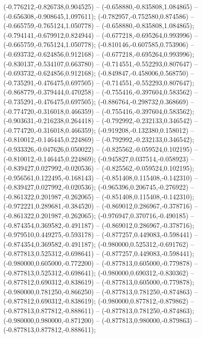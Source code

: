  (-0.776212,-0.826738,0.904525) -- (-0.658880,-0.835808,1.084865) -- (-0.656308,-0.908645,1.097611);
 (-0.782957,-0.752580,0.874586) -- (-0.665759,-0.765124,1.050778) -- (-0.658880,-0.835808,1.084865);
 (-0.794141,-0.679912,0.824944) -- (-0.677218,-0.695264,0.993996) -- (-0.665759,-0.765124,1.050778);
 (-0.810146,-0.607585,0.753906) -- (-0.693732,-0.624856,0.912168) -- (-0.677218,-0.695264,0.993996);
 (-0.830137,-0.534107,0.663780) -- (-0.714551,-0.552293,0.807647) -- (-0.693732,-0.624856,0.912168);
 (-0.849847,-0.458006,0.568750) -- (-0.735291,-0.476475,0.697505) -- (-0.714551,-0.552293,0.807647);
 (-0.868779,-0.379444,0.470258) -- (-0.755416,-0.397604,0.583562) -- (-0.735291,-0.476475,0.697505);
 (-0.886764,-0.298732,0.368669) -- (-0.774720,-0.316018,0.466359) -- (-0.755416,-0.397604,0.583562);
 (-0.903631,-0.216238,0.264418) -- (-0.792992,-0.232133,0.346542) -- (-0.774720,-0.316018,0.466359);
 (-0.919208,-0.132380,0.158012) -- (-0.810012,-0.146445,0.224869) -- (-0.792992,-0.232133,0.346542);
 (-0.933326,-0.047626,0.050022) -- (-0.825562,-0.059524,0.102195) -- (-0.810012,-0.146445,0.224869);
 (-0.945827,0.037514,-0.058923) -- (-0.839427,0.027992,-0.020536) -- (-0.825562,-0.059524,0.102195);
 (-0.956561,0.122495,-0.168143) -- (-0.851408,0.115408,-0.142310) -- (-0.839427,0.027992,-0.020536);
 (-0.965396,0.206745,-0.276922) -- (-0.861322,0.201987,-0.262065) -- (-0.851408,0.115408,-0.142310);
 (-0.972221,0.289681,-0.384520) -- (-0.869012,0.286967,-0.378716) -- (-0.861322,0.201987,-0.262065);
 (-0.976947,0.370716,-0.490185) -- (-0.874354,0.369582,-0.491187) -- (-0.869012,0.286967,-0.378716);
 (-0.979510,0.449275,-0.593178) -- (-0.877257,0.449083,-0.598441) -- (-0.874354,0.369582,-0.491187);
 (-0.980000,0.525312,-0.691762) -- (-0.877813,0.525312,-0.698641) -- (-0.877257,0.449083,-0.598441);
 (-0.980000,0.605000,-0.772200) -- (-0.877813,0.605000,-0.779878) -- (-0.877813,0.525312,-0.698641);
 (-0.980000,0.690312,-0.830362) -- (-0.877812,0.690312,-0.838619) -- (-0.877813,0.605000,-0.779878);
 (-0.980000,0.781250,-0.866250) -- (-0.877813,0.781250,-0.874863) -- (-0.877812,0.690312,-0.838619);
 (-0.980000,0.877812,-0.879862) -- (-0.877813,0.877812,-0.888611) -- (-0.877813,0.781250,-0.874863);
 (-0.980000,0.980000,-0.871200) -- (-0.877813,0.980000,-0.879863) -- (-0.877813,0.877812,-0.888611);
